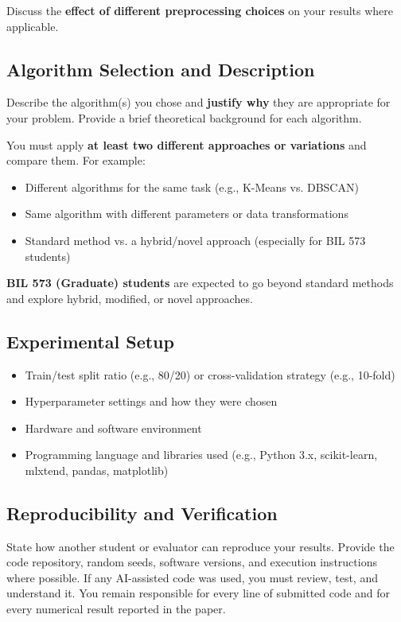 \documentclass[conference]{IEEEtran}
\begin{document}
	Discuss the \textbf{effect of different preprocessing choices} on your results where applicable.
	
	\subsection{Algorithm Selection and Description}
	Describe the algorithm(s) you chose and \textbf{justify why} they are appropriate for your problem. Provide a brief theoretical background for each algorithm.
	
	You must apply \textbf{at least two different approaches or variations} and compare them. For example:
	\begin{itemize}
		\item Different algorithms for the same task (e.g., K-Means vs. DBSCAN)
		\item Same algorithm with different parameters or data transformations
		\item Standard method vs. a hybrid/novel approach (especially for BIL 573 students)
	\end{itemize}
	
	\textbf{BIL 573 (Graduate) students} are expected to go beyond standard methods and explore hybrid, modified, or novel approaches.
	
	\subsection{Experimental Setup}
	\begin{itemize}
		\item Train/test split ratio (e.g., 80/20) or cross-validation strategy (e.g., 10-fold)
		\item Hyperparameter settings and how they were chosen
		\item Hardware and software environment
		\item Programming language and libraries used (e.g., Python 3.x, scikit-learn, mlxtend, pandas, matplotlib)
	\end{itemize}
	

	\subsection{Reproducibility and Verification}
	State how another student or evaluator can reproduce your results. Provide the code repository, random seeds, software versions, and execution instructions where possible. If any AI-assisted code was used, you must review, test, and understand it. You remain responsible for every line of submitted code and for every numerical result reported in the paper.
	
\end{document}
